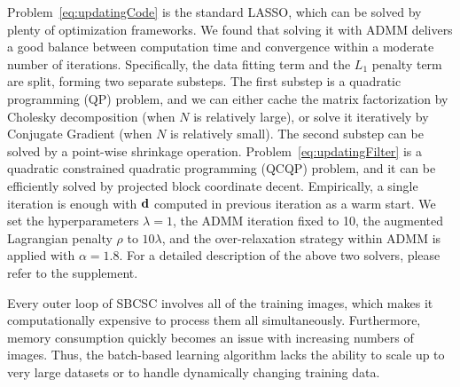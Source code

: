 Problem~\eqref{eq:updatingCode} is the standard LASSO, which can be
solved by plenty of optimization frameworks. We found that solving it
with ADMM delivers a good balance between computation time and
convergence within a moderate number of iterations. Specifically, the
data fitting term and the $L_1$ penalty term are split, forming two
separate substeps. The first substep is a quadratic programming (QP)
problem, and we can either cache the matrix factorization by Cholesky
decomposition (when $N$ is relatively large), or solve it iteratively
by Conjugate Gradient (when $N$ is relatively small). The second
substep can be solved by a point-wise shrinkage operation.
Problem~\ref{eq:updatingFilter} is a quadratic constrained
quadratic programming (QCQP) problem, and it can be efficiently solved
by projected block coordinate decent. Empirically, a single iteration
is enough with $\filter$ computed in previous iteration as a warm
start. We set the hyperparameters $\lambda=1$, the ADMM iteration
fixed to 10, the augmented Lagrangian penalty $\rho$ to $10 \lambda$,
and the over-relaxation strategy within ADMM is applied with $\alpha =
1.8$. For a detailed description of the above two solvers, please
refer to the supplement.

Every outer loop of SBCSC involves all of the training images, which
makes it computationally expensive to process them all simultaneously.
Furthermore, memory consumption quickly becomes an issue with
increasing numbers of images. Thus, the batch-based learning algorithm
lacks the ability to scale up to very large datasets or to handle
dynamically changing training data.


